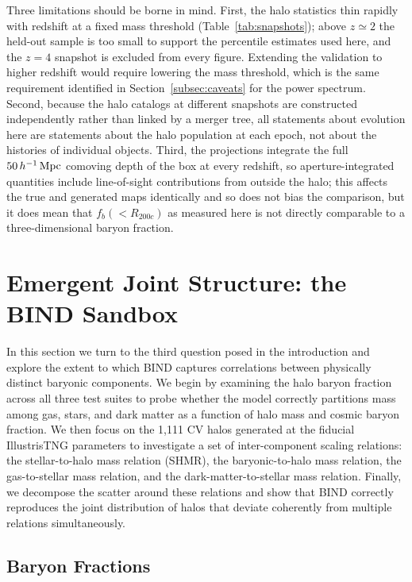 \documentclass[linenumbers,trackchanges, twocolumn]{aastex701}
\begin{document}
Three limitations should be borne in mind. First, the halo statistics thin
rapidly with redshift at a fixed mass threshold
(Table~\ref{tab:snapshots}); above $z \simeq 2$ the held-out sample is too small
to support the percentile estimates used here, and the $z=4$ snapshot is
excluded from every figure. Extending the validation to higher redshift would
require lowering the mass threshold, which is the same requirement identified in
Section~\ref{subsec:caveats} for the power spectrum. Second, because the halo
catalogs at different snapshots are constructed independently rather than linked
by a merger tree, all statements about evolution here are statements about the
halo population at each epoch, not about the histories of individual objects.
Third, the projections integrate the full $50\,h^{-1}\,{\rm Mpc}$ comoving depth
of the box at every redshift, so aperture-integrated quantities include
line-of-sight contributions from outside the halo; this affects the true and
generated maps identically and so does not bias the comparison, but it does mean
that $f_b(<\!R_{200c})$ as measured here is not directly comparable to a
three-dimensional baryon fraction.

\section{Emergent Joint Structure: the \textsc{BIND} Sandbox}
\label{sec:results}

In this section we turn to the third question posed in the introduction and explore the extent to which \textsc{BIND} captures correlations between physically distinct baryonic components. We begin by examining the halo baryon fraction across all three test suites to probe whether the model correctly partitions mass among gas, stars, and dark matter as a function of halo mass and cosmic baryon fraction. We then focus on the 1{,}111 CV halos generated at the fiducial IllustrisTNG parameters to investigate a set of inter-component scaling relations: the stellar-to-halo mass relation (SHMR), the baryonic-to-halo mass relation, the gas-to-stellar mass relation, and the dark-matter-to-stellar mass relation. Finally, we decompose the scatter around these relations and show that \textsc{BIND} correctly reproduces the joint distribution of halos that deviate coherently
from multiple relations simultaneously.

\subsection{Baryon Fractions}
\label{subsec:baryon_fraction}
\end{document}
